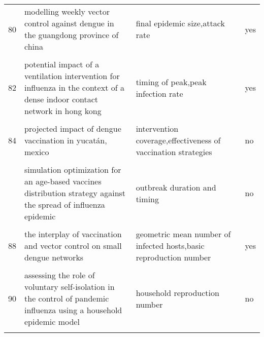 \documentclass[
]{article}
\begin{document}
\begin{landscape}
\begin{longtable}{l>{\raggedright\arraybackslash}p{4cm}>{\raggedright\arraybackslash}p{6cm}l}
80 & modelling weekly vector control against dengue in the guangdong province of china & final epidemic size,attack rate & yes\\
\addlinespace
\cellcolor{gray!6}{81} & \cellcolor{gray!6}{optimal control strategies for the spread of ebola in west africa} & \cellcolor{gray!6}{s,i and r curve} & \cellcolor{gray!6}{no}\\
82 & potential impact of a ventilation intervention for influenza in the context of a dense indoor contact network in hong kong & timing of peak,peak infection rate & yes\\
\cellcolor{gray!6}{83} & \cellcolor{gray!6}{predicting and evaluating the epidemic trend of ebola virus disease in the 2014-2015 outbreak and the effects of intervention measures} & \cellcolor{gray!6}{final epidemic size,total deaths} & \cellcolor{gray!6}{yes}\\
84 & projected impact of dengue vaccination in yucatán, mexico & intervention coverage,effectiveness of vaccination strategies & no\\
\cellcolor{gray!6}{85} & \cellcolor{gray!6}{seasonality and the effectiveness of mass vaccination} & \cellcolor{gray!6}{cases averted} & \cellcolor{gray!6}{no}\\
\addlinespace
86 & simulation optimization for an age-based vaccines distribution strategy against the spread of influenza epidemic & outbreak duration and timing & no\\
\cellcolor{gray!6}{87} & \cellcolor{gray!6}{spatiotemporal dynamics of the ebola epidemic in guinea and implications for vaccination and disease elimination: a computational modeling analysis} & \cellcolor{gray!6}{cumulative cases,incidence} & \cellcolor{gray!6}{yes}\\
88 & the interplay of vaccination and vector control on small dengue networks & geometric mean number of infected hosts,basic reproduction number & yes\\
\cellcolor{gray!6}{89} & \cellcolor{gray!6}{an epidemic patchy model with entry–exit screening} & \cellcolor{gray!6}{basic reproduction number} & \cellcolor{gray!6}{yes}\\
90 & assessing the role of voluntary self-isolation in the control of pandemic influenza using a household epidemic model & household reproduction number & no\\
\addlinespace
\cellcolor{gray!6}{91} & \cellcolor{gray!6}{be-codis: a mathematical model to predict the risk of human diseases spread between countries—validation and application to the 2014–2015 ebola virus disease epidemic} & \cellcolor{gray!6}{cumulative incidence,cumulative deaths} & \cellcolor{gray!6}{yes}\\

\end{longtable}
\end{landscape}
\end{document}

